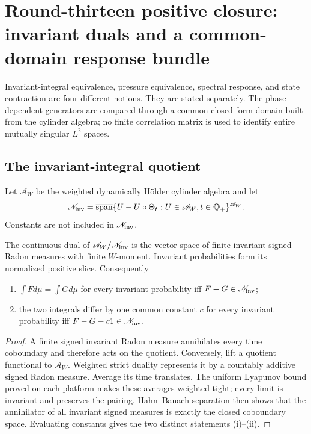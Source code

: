 \section{Round-thirteen positive closure: invariant duals and a common-domain response bundle}
\label{sec:r13-c2}

Invariant-integral equivalence, pressure equivalence, spectral response, and
state contraction are four different notions.  They are stated separately.
The phase-dependent generators are compared through a common closed form
domain built from the cylinder algebra; no finite correlation matrix is used
to identify entire mutually singular $L^2$ spaces.

\subsection{The invariant-integral quotient}

Let $\mathscr A_W$ be the weighted dynamically Hölder cylinder algebra and
let
\[
 \mathscr N_{\rm inv}
 =\overline{\operatorname{span}}
 \{U-U\circ\Theta_t:U\in\mathscr A_W,
                         t\in\mathbb Q_+\}^{\mathscr A_W}.
\]
Constants are not included in $\mathscr N_{\rm inv}$.

\begin{theorem}
\label{thm:r13-c2-dual}
The continuous dual of
$\mathscr A_W/\mathscr N_{\rm inv}$ is the vector space of finite invariant
signed Radon measures with finite $W$-moment.  Invariant probabilities form
its normalized positive slice.  Consequently
\begin{enumerate}[label=(\roman*)]
\item $\int Fd\mu=\int Gd\mu$ for every invariant probability iff
      $F-G\in\mathscr N_{\rm inv}$;
\item the two integrals differ by one common constant $c$ for every invariant
      probability iff $F-G-c1\in\mathscr N_{\rm inv}$.
\end{enumerate}
\end{theorem}

\begin{proof}
A finite signed invariant Radon measure annihilates every time coboundary and
therefore acts on the quotient.  Conversely, lift a quotient functional to
$\mathscr A_W$.  Weighted strict duality represents it by a countably additive
signed Radon measure.  Average its time translates.  The uniform Lyapunov
bound proved on each platform makes these averages weighted-tight; every
limit is invariant and preserves the pairing.  Hahn--Banach separation then
shows that the annihilator of all invariant signed measures is exactly the
closed coboundary space.  Evaluating constants gives the two distinct
statements (i)--(ii).
\end{proof}

